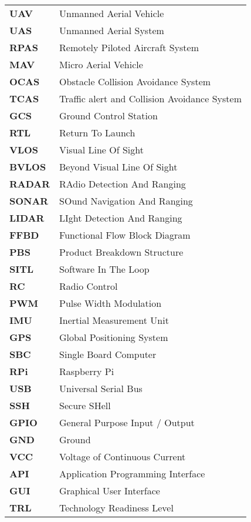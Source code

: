 	\begin{tabular}{>{\bf}l @{\hspace{1cm}} l}
			\rowcolor{white}
		UAV		&	Unmanned Aerial Vehicle	\\
        UAS		&	Unmanned Aerial System	\\
			\rowcolor{white}
        RPAS	&	Remotely Piloted Aircraft System	\\
        MAV		&	Micro Aerial Vehicle	\\
			\rowcolor{white}
        OCAS	&	Obstacle Collision Avoidance System	\\
        TCAS	&	Traffic alert and Collision Avoidance System	\\
			\rowcolor{white}
        GCS		&	Ground Control Station	\\
        RTL		&	Return To Launch	\\
			\rowcolor{white}
        VLOS	&	Visual Line Of Sight	\\
        BVLOS	&	Beyond Visual Line Of Sight	\\
			\rowcolor{white}
        RADAR	&	RAdio Detection And Ranging	\\
        SONAR	&	SOund Navigation And Ranging	\\
			\rowcolor{white}
        LIDAR	&	LIght Detection And Ranging	\\
        FFBD	&	Functional Flow Block Diagram	\\
			\rowcolor{white}
        PBS		&	Product Breakdown Structure	\\
        SITL	&	Software In The Loop	\\
			\rowcolor{white}
        RC		&	Radio Control	\\
        PWM		&	Pulse Width Modulation	\\
			\rowcolor{white}
        IMU		&	Inertial Measurement Unit	\\
        GPS		&	Global Positioning System	\\
			\rowcolor{white}
        SBC		&	Single Board Computer	\\
        RPi		&	Raspberry Pi	\\
			\rowcolor{white}
        USB		&	Universal Serial Bus	\\
        SSH		&	Secure SHell	\\
			\rowcolor{white}
        GPIO	&	General Purpose Input / Output \\
        GND		&	Ground	\\
			\rowcolor{white}
        VCC		&	Voltage of Continuous Current	\\
        API		&	Application Programming Interface	\\
			\rowcolor{white}
        GUI		&	Graphical User Interface	\\
		TRL		&	Technology Readiness Level	\\
	\end{tabular}
